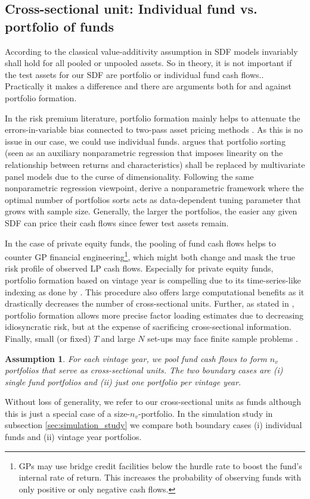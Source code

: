 \documentclass[12pt]{article}
\newtheorem{assume}{Assumption}
\begin{document}
\subsection{Cross-sectional unit: Individual fund vs. portfolio of funds}
\label{sec:cross_sectional_unit}

According to the classical value-additivity assumption in \cite{HR87} SDF models invariably shall hold for all pooled or unpooled assets.
So in theory, it is not important if the test assets for our SDF are portfolio or individual fund cash flows..
Practically it makes a difference and there are arguments both for and against portfolio formation.

In the risk premium literature, portfolio formation mainly helps to attenuate the errors-in-variable bias connected to two-pass asset pricing methods \citep{JNPR19,PRS19}.
As this is no issue in our case, we could use individual funds.
\cite{C11} argues that portfolio sorting (seen as an auxiliary nonparametric regression that imposes linearity on the relationship between returns and characteristics) shall be replaced by multivariate panel models due to the curse of dimensionality.
Following the same nonparametric regression viewpoint, \cite{CCF19} derive a nonparametric framework where the optimal number of portfolios sorts acts as data-dependent tuning parameter that grows with sample size.
Generally, the larger the portfolios, the easier any given SDF can price their cash flows since fewer test assets remain.

In the case of private equity funds, the pooling of fund cash flows helps to counter GP financial engineering\footnote{GPs may use bridge credit facilities below the hurdle rate to boost the fund's internal rate of return. This increases the probability of observing funds with only positive or only negative cash flows.}, which might both change and mask the true risk profile of observed LP cash flows.
Especially for private equity funds, portfolio formation based on vintage year is compelling due to its time-series-like indexing as done by \cite{DLP12}.
This procedure also offers large computational benefits as it drastically decreases the number of cross-sectional units.
Further, as stated in \cite{ALS20}, portfolio formation allows more precise factor loading estimates  due to decreasing idiosyncratic risk, but at the expense of sacrificing cross-sectional information.
Finally, small (or fixed) $T$ and large $N$ set-ups may face finite sample problems \citep{RRZ20}.

\begin{assume}
	\label{as:portfolio}
	For each vintage year, we pool fund cash flows to form $n_v$ portfolios that serve as cross-sectional units.
	The two boundary cases are (i) single fund portfolios and (ii) just one portfolio per vintage year. 
\end{assume}
Without loss of generality, we refer to our cross-sectional units as funds although this is just a special case of a size-$n_v$-portfolio.
In the simulation study in subsection \ref{sec:simulation_study} we compare both boundary cases (i) individual funds and (ii) vintage year portfolios.
\end{document}
